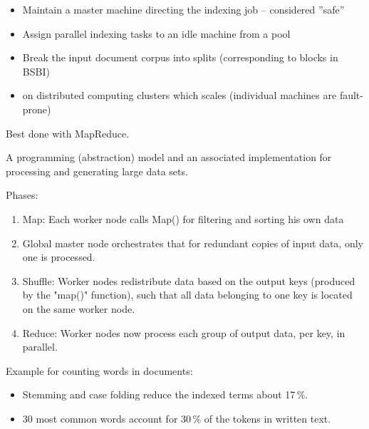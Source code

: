 \begin{breakbox}

\begin{itemize}
	\item Maintain a master machine directing the indexing job -- considered ''safe''
	\item Assign parallel indexing tasks to an idle machine from a pool
	\item Break the input document corpus into splits (corresponding to blocks in BSBI)
	\item on distributed computing clusters which scales (individual machines are fault-prone)
\end{itemize}

Best done with MapReduce.
\end{breakbox}

\begin{breakbox}

A programming (abstraction) model and an associated implementation for processing and generating large data sets.

Phases:
\begin{enumerate}
	\item Map: Each worker node calls Map() for filtering and sorting his own data
	\item Global master node orchestrates that for redundant copies of input data, only one is processed.
	\item Shuffle: Worker nodes redistribute data based on the output keys (produced by the "map()" function), such that all data belonging to one key is located on the same worker node.
	\item Reduce: Worker nodes now process each group of output data, per key, in parallel.
\end{enumerate}

Example for counting words in documents:
\end{breakbox}

\begin{breakbox}

\begin{itemize}
	\item Stemming and case folding reduce the indexed terms about 17\,\%.
	\item 30 most common words account for 30\,\% of the tokens in written text.
\end{itemize}
\end{breakbox}


